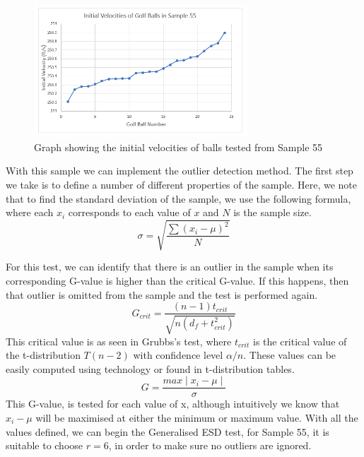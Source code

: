 \documentclass[11pt]{article}
\begin{document}
\begin{figure}[H]
    \centering
    \includegraphics[width=80mm]{Sample55new.png}
    \caption{Graph showing the initial velocities of balls tested from Sample 55}
    \label{figure 5}
\end{figure}

With this sample we can implement the outlier detection method. The first step we take is to define a number of different properties of the sample. Here, we note that to find the standard deviation of the sample, we use the following formula, where each $x_i$ corresponds to each value of $x$ and $N$ is the sample size.
$$\sigma = \sqrt{\frac{\sum (x_i - \mu)^2}{N}}$$

For this test, we can identify that there is an outlier in the sample when its corresponding G-value is higher than the critical G-value. If this happens, then that outlier is omitted from the sample and the test is performed again. 
$$G_{crit}= \frac{(n-1)t_{crit}}{\sqrt{n(d_f + t_{crit}^2)}}$$
This critical value is as seen in Grubbs's test, where $t_{crit}$ is the critical value of the t-distribution $T(n-2)$ with confidence level $\alpha/n$.\cite{Zmuk} These values can be easily computed using technology or found in t-distribution tables. 
$$G=\frac{max\mid{x_i - \mu}\mid}{\sigma}$$
This G-value, is tested for each value of x, although intuitively we know that $x_i -\mu$ will be maximised at either the minimum or maximum value. With all the values defined, we can begin the Generalised ESD test, for Sample 55, it is suitable to choose $r=6$, in order to make sure no outliers are ignored.  
\end{document}
